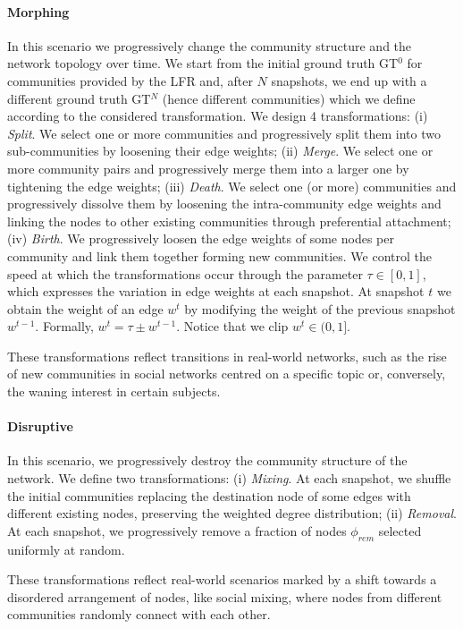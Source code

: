 \documentclass[letterpaper]{article}
\begin{document}
\paragraph*{Morphing} In this scenario we progressively change the community structure and the network topology over time.
We start from the initial ground truth GT$^0$ for communities provided by the LFR and, after $N$ snapshots, we end up with a different ground truth GT$^N$ (hence different communities) which we define according to the considered transformation.
We design 4 transformations: (i) \emph{Split}. We select one or more communities and progressively split them into two sub-communities by loosening their edge weights; {(ii) \emph{Merge}}. We select one or more community pairs and progressively merge them into a larger one by tightening the edge weights; (iii) \emph{Death}. We select one (or more) communities and progressively dissolve them by loosening the intra-community edge weights and linking the nodes to other existing communities through preferential attachment; (iv) \emph{Birth}. We progressively loosen the edge weights of some nodes per community and link them together forming new communities. We control the speed at which the transformations occur through the parameter $\tau \in[0, 1]$, which expresses the variation in edge weights at each snapshot. At snapshot $t$ we obtain the weight of an edge $w^t$ by modifying the weight of the previous snapshot $w^{t-1}$. Formally, $w^t = \tau \pm w^{t-1}$. Notice that we clip $w^t \in (0, 1]$.

These transformations reflect transitions in real-world networks, such as the rise of new communities in social networks centred on a specific topic or, conversely, the waning interest in certain subjects.

\paragraph*{Disruptive}
In this scenario, we progressively destroy the community structure of the network. We define two transformations: (i) \emph{Mixing}. At each snapshot, we shuffle the initial communities replacing the destination node of some edges with different existing nodes, preserving the weighted degree distribution; (ii) \emph{Removal}. At each snapshot, we progressively remove a fraction of nodes $\phi_{rem}$ selected uniformly at random.

These transformations reflect real-world scenarios marked by a shift towards a disordered arrangement of nodes, like social mixing, where nodes from different communities randomly connect with each other.
\end{document}
